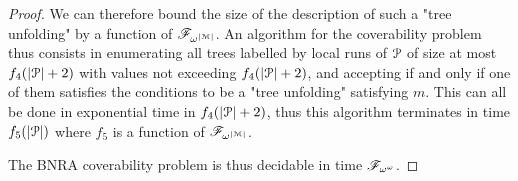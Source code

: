 \begin{proof}
	We can therefore bound the size of the description of such a "tree unfolding" by a function of $\mathscr{F}_{\omega^{|\mathcal{M}|}}$.
	An algorithm for the coverability problem thus consists in enumerating all trees labelled by local runs of $\mathcal{P}$ of size at most $f_4(|\mathcal{P}|+2)$ with values not exceeding $f_4(|\mathcal{P}|+2)$, and accepting if and only if one of them satisfies the conditions to be a "tree unfolding" satisfying $m$.
	This can all be done in exponential time in $f_4(|\mathcal{P}|+2)$, thus this algorithm terminates in time $f_5(|\mathcal{P}|)$ where $f_5$ is a function of $\mathscr{F}_{\omega^{|\mathcal{M}|}}$.
	
	The BNRA coverability problem is thus decidable in time $\mathscr{F}_{\omega^\omega}$.
\end{proof}
\fi
